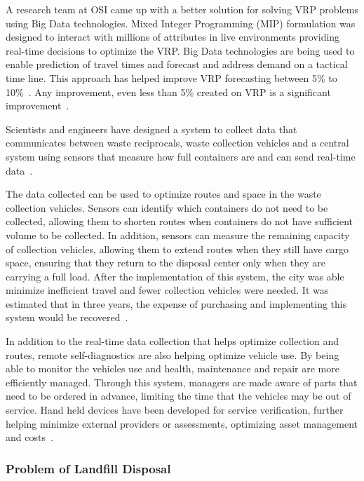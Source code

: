 A research team at OSI came up with a better solution for solving VRP 
problems using Big Data technologies. Mixed Integer Programming (MIP) 
formulation was designed to interact with millions of attributes in live 
environments providing real-time decisions to optimize the VRP. Big Data 
technologies are being used to enable prediction of travel times and 
forecast and address demand on a tactical time line. This approach has 
helped improve VRP forecasting between  5\% to 10\%~\cite{vijay2013}. 
Any improvement, even less than 5\% created on VRP is a significant 
improvement~\cite{hasle2007}.

Scientists and engineers have designed a system to collect data that 
communicates between waste reciprocals, waste collection vehicles and a 
central system using sensors that measure how full containers are and can 
send real-time data~\cite{faccio2011}.

The data collected can be used to optimize routes and space in the waste 
collection vehicles.  Sensors can identify which containers do not need 
to be collected, allowing them to shorten routes when containers do not 
have sufficient volume to be collected.  In addition, sensors can measure 
the remaining capacity of collection vehicles, allowing them to extend routes 
when they still have cargo space, ensuring that they return to the disposal 
center only when they are carrying a full load.  After the implementation 
of this system, the city was able minimize inefficient travel and fewer 
collection vehicles were needed.  It was estimated that in three years, 
the expense of purchasing and implementing this system would be 
recovered~\cite{shahrokni2014big}.

In addition to the real-time data collection that helps optimize collection 
and routes, remote self-diagnostics are also helping optimize vehicle use. 
By being able to monitor the vehicles use and health, maintenance and repair 
are more efficiently managed.  Through this system, managers are made aware 
of parts that need to be ordered in advance, limiting the time that the 
vehicles may be out of service.  Hand held devices have been developed for 
service verification, further helping minimize external providers or 
assessments, optimizing asset management and costs~\cite{megan2017}.

\subsubsection{Problem of Landfill Disposal}

